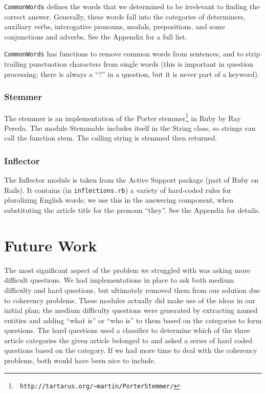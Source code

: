 \documentclass[11pt]{article}
\begin{document}
\texttt{CommonWords} defines the words that we determined to be irrelevant to
finding the correct answer. Generally, these words fall into the categories of
determiners, auxiliary verbs, interogative pronouns, modals, prepositions, and
some conjunctions and adverbs. See the Appendix for a full list.

\texttt{CommonWords} has functions to remove common words from sentences, and to
strip trailing punctuation characters from single words (this is important in
question processing; there is always a ``?'' in a question, but it is never part
of a keyword).

\subsubsection{Stemmer}

The stemmer is an implementation of the Porter stemmer\footnote{\tt
http://tartarus.org/\~{}martin/PorterStemmer/} in Ruby by Ray Pereda. The module
Stemmable includes itself in the String class, so strings can call the function
stem. The calling string is stemmed then returned.

\subsubsection{Inflector}

The Inflector module is taken from the Active Support package (part of Ruby on
Rails). It contains (in \texttt{inflections.rb}) a variety of hard-coded rules
for pluralizing English words; we use this in the answering component, when
substituting the article title for the pronoun ``they''. See the Appendix for
details.

\section{Future Work}

The most significant aspect of the problem we struggled with was asking more
difficult questions. We had implementations in place to ask both medium
difficulty and hard questions, but ultimately removed them from our solution due
to coherency problems. These modules actually did make use of the ideas in our
initial plan; the medium difficulty questions were generated by extracting named
entities and adding ``what is'' or ``who is'' to them based on the categories to
form questions. The hard questions used a classifier to determine which of the
three article categories the given article belonged to and asked a series of
hard coded questions based on the category. If we had more time to deal with the
coherency problems, both would have been nice to include.
\end{document}
